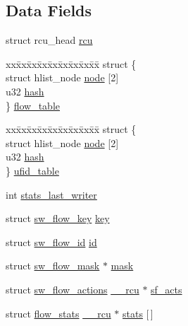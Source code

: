\subsection*{Data Fields}
\begin{DoxyCompactItemize}
\item 
struct rcu\+\_\+head \hyperlink{structsw__flow_ac58ef2fab6f9d88be75d73e4d2a1e002}{rcu}
\item 
\begin{tabbing}
xx\=xx\=xx\=xx\=xx\=xx\=xx\=xx\=xx\=\kill
struct \{\\
\>struct hlist\_node \hyperlink{structsw__flow_ad56483ca56d2f95857eee360e934fcf2}{node} \mbox{[}2\mbox{]}\\
\>u32 \hyperlink{structsw__flow_a7a33a6a5c62113ffe949a700ef648a71}{hash}\\
\} \hyperlink{structsw__flow_abca0040cced6a4a84d1a8941764fb5d6}{flow\_table}\\

\end{tabbing}\item 
\begin{tabbing}
xx\=xx\=xx\=xx\=xx\=xx\=xx\=xx\=xx\=\kill
struct \{\\
\>struct hlist\_node \hyperlink{structsw__flow_ad56483ca56d2f95857eee360e934fcf2}{node} \mbox{[}2\mbox{]}\\
\>u32 \hyperlink{structsw__flow_a7a33a6a5c62113ffe949a700ef648a71}{hash}\\
\} \hyperlink{structsw__flow_af5dad10ae036092f5a26cfebb050a03a}{ufid\_table}\\

\end{tabbing}\item 
int \hyperlink{structsw__flow_a7b4a10d23b2824b421527bc2600ef4ba}{stats\+\_\+last\+\_\+writer}
\item 
struct \hyperlink{structsw__flow__key}{sw\+\_\+flow\+\_\+key} \hyperlink{structsw__flow_a14b83cbd65275bda4e97ae35500d26d8}{key}
\item 
struct \hyperlink{structsw__flow__id}{sw\+\_\+flow\+\_\+id} \hyperlink{structsw__flow_a6e6645eec909d54871675be30000c0b9}{id}
\item 
struct \hyperlink{structsw__flow__mask}{sw\+\_\+flow\+\_\+mask} $\ast$ \hyperlink{structsw__flow_a89c162e340693d0bb4977737e2b68c22}{mask}
\item 
struct \hyperlink{structsw__flow__actions}{sw\+\_\+flow\+\_\+actions} \hyperlink{compiler_8h_a2b3b0c016258969e4b39c66b6eec2129}{\+\_\+\+\_\+rcu} $\ast$ \hyperlink{structsw__flow_aa845bdaabc25d81dcf8b1a7519b35408}{sf\+\_\+acts}
\item 
struct \hyperlink{structflow__stats}{flow\+\_\+stats} \hyperlink{compiler_8h_a2b3b0c016258969e4b39c66b6eec2129}{\+\_\+\+\_\+rcu} $\ast$ \hyperlink{structsw__flow_a5ccc743bcf16038ab0cf5dda88565f33}{stats} \mbox{[}$\,$\mbox{]}
\end{DoxyCompactItemize}


